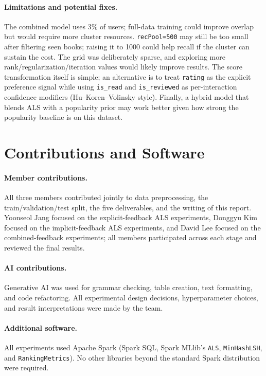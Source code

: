 \documentclass[10pt,twocolumn]{article}
\begin{document}
\paragraph{Limitations and potential fixes.} The combined model uses 3\% of users; full-data training could improve overlap but would require more cluster resources. \texttt{recPool=500} may still be too small after filtering seen books; raising it to 1000 could help recall if the cluster can sustain the cost. The grid was deliberately sparse, and exploring more rank/regularization/iteration values would likely improve results. The score transformation itself is simple; an alternative is to treat \texttt{rating} as the explicit preference signal while using \texttt{is\_read} and \texttt{is\_reviewed} as per-interaction confidence modifiers (Hu--Koren--Volinsky style). Finally, a hybrid model that blends ALS with a popularity prior may work better given how strong the popularity baseline is on this dataset.

\section*{Contributions and Software}

\paragraph{Member contributions.} All three members contributed jointly to data preprocessing, the train/validation/test split, the five deliverables, and the writing of this report. Yoonseol Jang focused on the explicit-feedback ALS experiments, Donggyu Kim focused on the implicit-feedback ALS experiments, and David Lee focused on the combined-feedback experiments; all members participated across each stage and reviewed the final results.

\paragraph{AI contributions.} Generative AI was used for grammar checking, table creation, text formatting, and code refactoring. All experimental design decisions, hyperparameter choices, and result interpretations were made by the team.

\paragraph{Additional software.} All experiments used Apache Spark (Spark SQL, Spark MLlib's \texttt{ALS}, \texttt{MinHashLSH}, and \texttt{RankingMetrics}). No other libraries beyond the standard Spark distribution were required.
\end{document}
